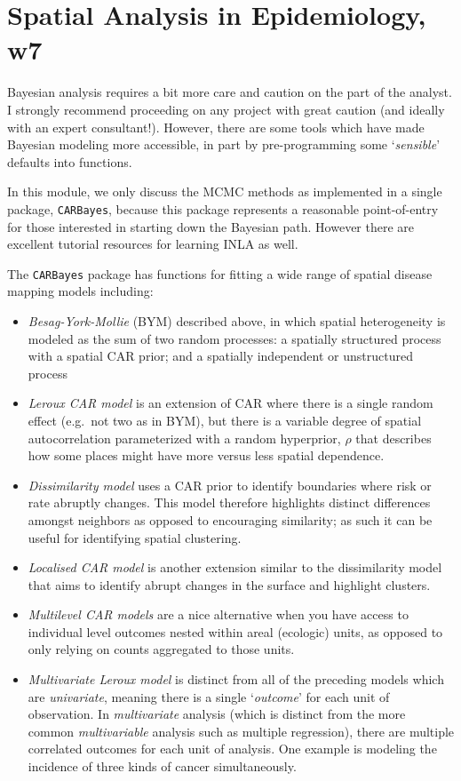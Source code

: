 \documentclass[
]{book}
\newcommand{\passthrough}[1]{#1}
\providecommand{\tightlist}{%
  \setlength{\itemsep}{0pt}\setlength{\parskip}{0pt}}
\begin{document}
\hypertarget{spatial-analysis-in-epidemiology-w7}{%
\section{Spatial Analysis in Epidemiology, w7}\label{spatial-analysis-in-epidemiology-w7}}

Bayesian analysis requires a bit more care and caution on the part of the analyst. I strongly recommend proceeding on any project with great caution (and ideally with an expert consultant!). However, there are some tools which have made Bayesian modeling more accessible, in part by pre-programming some `\emph{sensible}' defaults into functions.

In this module, we only discuss the MCMC methods as implemented in a single package, \passthrough{\lstinline!CARBayes!}, because this package represents a reasonable point-of-entry for those interested in starting down the Bayesian path. However there are excellent tutorial resources for learning INLA as well.

The \passthrough{\lstinline!CARBayes!} package has functions for fitting a wide range of spatial disease mapping models including:

\begin{itemize}
\tightlist
\item
  \emph{Besag-York-Mollie} (BYM) described above, in which spatial heterogeneity is modeled as the sum of two random processes: a spatially structured process with a spatial CAR prior; and a spatially independent or unstructured process
\item
  \emph{Leroux CAR model} is an extension of CAR where there is a single random effect (e.g.~not two as in BYM), but there is a variable degree of spatial autocorrelation parameterized with a random hyperprior, \(\rho\) that describes how some places might have more versus less spatial dependence.
\item
  \emph{Dissimilarity model} uses a CAR prior to identify boundaries where risk or rate abruptly changes. This model therefore highlights distinct differences amongst neighbors as opposed to encouraging similarity; as such it can be useful for identifying spatial clustering.
\item
  \emph{Localised CAR model} is another extension similar to the dissimilarity model that aims to identify abrupt changes in the surface and highlight clusters.
\item
  \emph{Multilevel CAR models} are a nice alternative when you have access to individual level outcomes nested within areal (ecologic) units, as opposed to only relying on counts aggregated to those units.
\item
  \emph{Multivariate Leroux model} is distinct from all of the preceding models which are \emph{univariate}, meaning there is a single `\emph{outcome}' for each unit of observation. In \emph{multivariate} analysis (which is distinct from the more common \emph{multivariable} analysis such as multiple regression), there are multiple correlated outcomes for each unit of analysis. One example is modeling the incidence of three kinds of cancer simultaneously.
\end{itemize}
\end{document}
